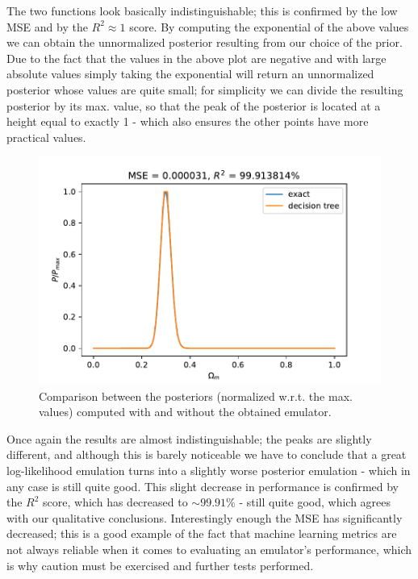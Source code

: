 The two functions look basically indistinguishable; this is confirmed by the low MSE and by the $R^2\approx 1$ score.
By computing the exponential of the above values we can obtain the unnormalized posterior resulting from our choice of the prior.
Due to the fact that the values in the above plot are negative and with large absolute values simply taking the exponential will return an unnormalized posterior whose values are quite small; for simplicity we can divide the resulting posterior by its max. value, so that the peak of the posterior is located at a height equal to exactly 1 - which also ensures the other points have more practical values.

\begin{figure}[H]
    \centering
    \includegraphics[width=1.0\textwidth]{img/posterior_dt.pdf}
    \caption{Comparison between the posteriors (normalized w.r.t. the max. values) computed with and without the obtained emulator.}
    \label{fig:posterior_dt}
\end{figure}
Once again the results are almost indistinguishable; the peaks are slightly different, and although this is barely noticeable we have to conclude that a great log-likelihood emulation turns into a slightly worse posterior emulation - which in any case is still quite good. This slight decrease in performance is confirmed by the $R^2$ score, which has decreased to $\sim 99.91\%$ - still quite good, which agrees with our qualitative conclusions. Interestingly enough the MSE has significantly decreased; this is a good example of the fact that machine learning metrics are not always reliable when it comes to evaluating an emulator's performance, which is why caution must be exercised and further tests performed.

